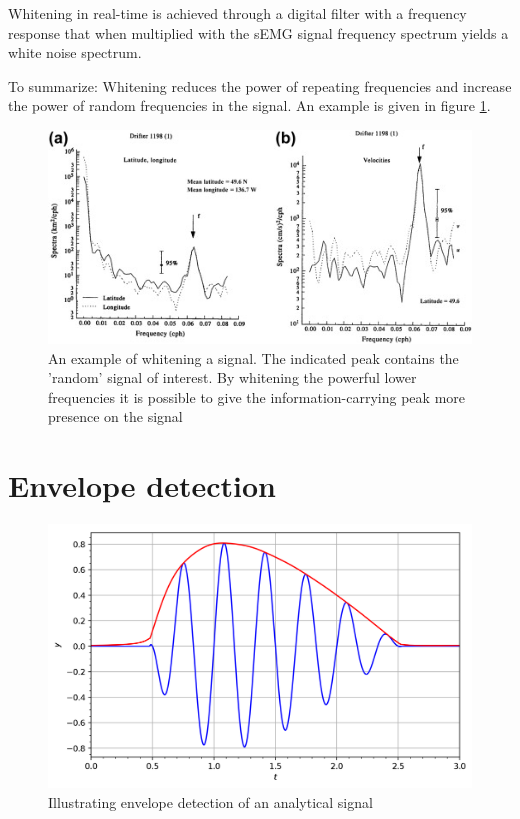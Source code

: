Whitening in real-time is achieved through a digital filter with a frequency response that when multiplied with the sEMG signal frequency spectrum yields a white noise spectrum.

To summarize: Whitening reduces the power of repeating frequencies and increase the power of random frequencies in the signal. An example is given in figure \ref{fig:whitening_example}.

\begin{figure}[h!t]
	\begin{center}
		\includegraphics[width=0.7\columnwidth]{images/prewhitening_example.jpg}
	\end{center}
	\caption{An example of whitening a signal. The indicated peak contains the 'random' signal of interest. By whitening the powerful lower frequencies it is possible to give the information-carrying peak more presence on the signal \cite{time_series_analysis_methods}}
	\label{fig:whitening_example}
\end{figure}


\section{Envelope detection}

\begin{figure}[h!t]
	\begin{center}
		\includegraphics[width=0.7\columnwidth]{images/envelope_wikipedia.png}
	\end{center}
	\caption{Illustrating envelope detection of an analytical signal \cite{envelope_wikipedia}}
	\label{fig:envelope_wikipedia}
\end{figure}

